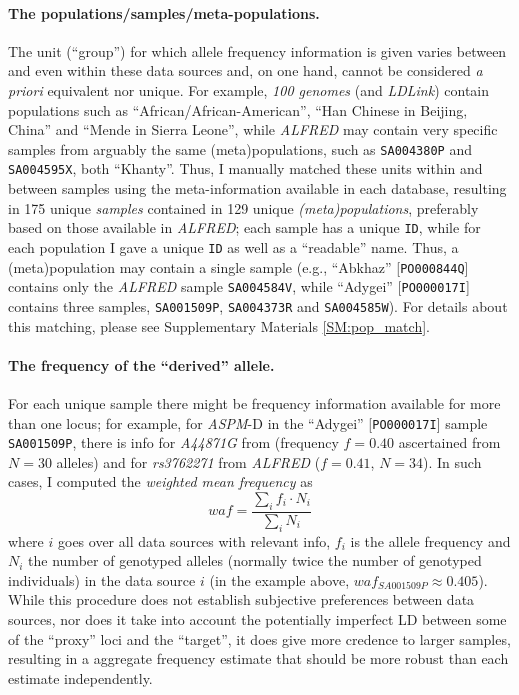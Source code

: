 \documentclass[twoside,twocolumn]{article}
\begin{document}
\paragraph{The populations/samples/meta-populations.}
The unit (``group'') for which allele frequency information is given varies between and even within these data sources and, on one hand, cannot be considered \textit{a priori} equivalent nor unique.
For example, \textit{100 genomes} (and \textit{LDLink}) contain populations such as ``African/African-American'', ``Han Chinese in Beijing, China'' and ``Mende in Sierra Leone'', while \textit{ALFRED} may contain very specific samples from arguably the same (meta)populations, such as \texttt{SA004380P} and \texttt{SA004595X}, both ``Khanty''.
Thus, I manually matched these units within and between samples using the meta-information available in each database, resulting in 175 unique \emph{samples} contained in 129 unique \emph{(meta)populations}, preferably based on those available in \textit{ALFRED}; each sample has a unique \texttt{ID}, while for each population I gave a unique \texttt{ID} as well as a ``readable'' name.
Thus, a (meta)population may contain a single sample (e.g., ``Abkhaz'' [\texttt{PO000844Q}] contains only the \textit{ALFRED} sample \texttt{SA004584V}, while ``Adygei'' [\texttt{PO000017I}] contains three samples, \texttt{SA001509P}, \texttt{SA004373R} and \texttt{SA004585W}).
For details about this matching, please see Supplementary Materials \ref{SM:pop_match}.

\paragraph{The frequency of the ``derived'' allele.}
For each unique sample there might be frequency information available for more than one locus; for example, for \textit{ASPM}-D in the ``Adygei'' [\texttt{PO000017I}] sample \texttt{SA001509P}, there is info for \textit{A44871G} from \citet{mekelbobrov_aspm_2005} (frequency $f=0.40$ ascertained from $N=30$ alleles) and for \textit{rs3762271} from \textit{ALFRED} ($f=0.41$, $N=34$).
In such cases, I computed the \emph{weighted mean frequency} as
$$waf = \frac{\sum_{i}{f_{i} \cdot N_{i}}}{\sum_{i}{N_{i}}}$$
where $i$ goes over all data sources with relevant info, $f_{i}$ is the allele frequency and $N_{i}$ the number of genotyped alleles (normally twice the number of genotyped individuals) in the data source $i$ (in the example above, $waf_{SA001509P} \approx 0.405$).
While this procedure does not establish subjective preferences between data sources, nor does it take into account the potentially imperfect LD between some of the ``proxy'' loci and the ``target'', it does give more credence to larger samples, resulting in a aggregate frequency estimate that should be more robust than each estimate independently.
\end{document}
